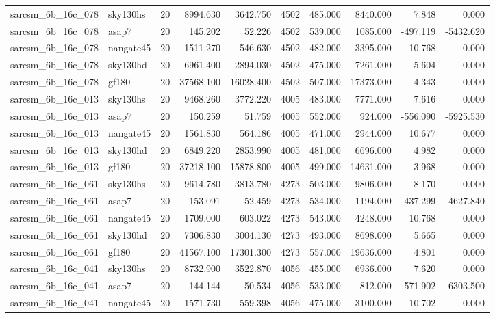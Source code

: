 \documentclass{article}
\begin{document}
\begin{longtable}{llrrrrrrrr}
sarcsm\_6b\_16c\_078 & sky130hs & 20 & 8994.630 & 3642.750 & 4502 & 485.000 & 8440.000 & 7.848 & 0.000 \\
sarcsm\_6b\_16c\_078 & asap7 & 20 & 145.202 & 52.226 & 4502 & 539.000 & 1085.000 & -497.119 & -5432.620 \\
sarcsm\_6b\_16c\_078 & nangate45 & 20 & 1511.270 & 546.630 & 4502 & 482.000 & 3395.000 & 10.768 & 0.000 \\
sarcsm\_6b\_16c\_078 & sky130hd & 20 & 6961.400 & 2894.030 & 4502 & 475.000 & 7261.000 & 5.604 & 0.000 \\
sarcsm\_6b\_16c\_078 & gf180 & 20 & 37568.100 & 16028.400 & 4502 & 507.000 & 17373.000 & 4.343 & 0.000 \\
sarcsm\_6b\_16c\_013 & sky130hs & 20 & 9468.260 & 3772.220 & 4005 & 483.000 & 7771.000 & 7.616 & 0.000 \\
sarcsm\_6b\_16c\_013 & asap7 & 20 & 150.259 & 51.759 & 4005 & 552.000 & 924.000 & -556.090 & -5925.530 \\
sarcsm\_6b\_16c\_013 & nangate45 & 20 & 1561.830 & 564.186 & 4005 & 471.000 & 2944.000 & 10.677 & 0.000 \\
sarcsm\_6b\_16c\_013 & sky130hd & 20 & 6849.220 & 2853.990 & 4005 & 481.000 & 6696.000 & 4.982 & 0.000 \\
sarcsm\_6b\_16c\_013 & gf180 & 20 & 37218.100 & 15878.800 & 4005 & 499.000 & 14631.000 & 3.968 & 0.000 \\
sarcsm\_6b\_16c\_061 & sky130hs & 20 & 9614.780 & 3813.780 & 4273 & 503.000 & 9806.000 & 8.170 & 0.000 \\
sarcsm\_6b\_16c\_061 & asap7 & 20 & 153.091 & 52.459 & 4273 & 534.000 & 1194.000 & -437.299 & -4627.840 \\
sarcsm\_6b\_16c\_061 & nangate45 & 20 & 1709.000 & 603.022 & 4273 & 543.000 & 4248.000 & 10.768 & 0.000 \\
sarcsm\_6b\_16c\_061 & sky130hd & 20 & 7306.830 & 3004.130 & 4273 & 493.000 & 8698.000 & 5.665 & 0.000 \\
sarcsm\_6b\_16c\_061 & gf180 & 20 & 41567.100 & 17301.300 & 4273 & 557.000 & 19636.000 & 4.801 & 0.000 \\
sarcsm\_6b\_16c\_041 & sky130hs & 20 & 8732.900 & 3522.870 & 4056 & 455.000 & 6936.000 & 7.620 & 0.000 \\
sarcsm\_6b\_16c\_041 & asap7 & 20 & 144.144 & 50.534 & 4056 & 533.000 & 812.000 & -571.902 & -6303.500 \\
sarcsm\_6b\_16c\_041 & nangate45 & 20 & 1571.730 & 559.398 & 4056 & 475.000 & 3100.000 & 10.702 & 0.000 \\

\end{longtable}
\end{document}
